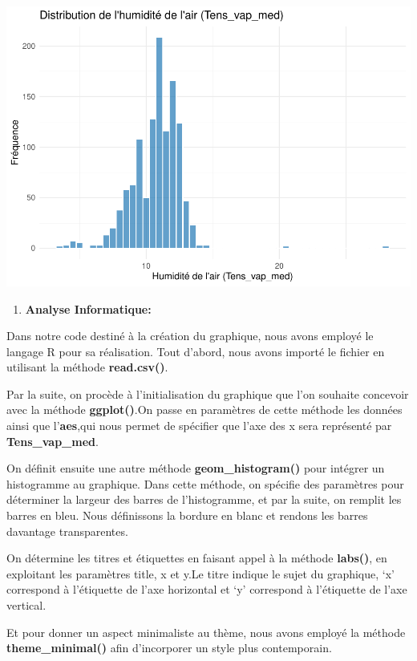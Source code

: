 \documentclass[
]{article}
\providecommand{\tightlist}{%
  \setlength{\itemsep}{0pt}\setlength{\parskip}{0pt}}
\begin{document}
\includegraphics{Rapport_files/figure-latex/unnamed-chunk-1-1.pdf}

\begin{enumerate}
\def\labelenumi{\arabic{enumi}.}
\tightlist
\item
  \textbf{Analyse Informatique:}
\end{enumerate}

Dans notre code destiné à la création du graphique, nous avons employé
le langage R pour sa réalisation. Tout d'abord, nous avons importé le
fichier en utilisant la méthode \textbf{read.csv()}.

Par la suite, on procède à l'initialisation du graphique que l'on
souhaite concevoir avec la méthode \textbf{ggplot()}.On passe en
paramètres de cette méthode les données ainsi que l'\textbf{aes},qui
nous permet de spécifier que l'axe des x sera représenté par
\textbf{Tens\_vap\_med}.

On définit ensuite une autre méthode \textbf{geom\_histogram()} pour
intégrer un histogramme au graphique. Dans cette méthode, on spécifie
des paramètres pour déterminer la largeur des barres de l'histogramme,
et par la suite, on remplit les barres en bleu. Nous définissons la
bordure en blanc et rendons les barres davantage transparentes.

On détermine les titres et étiquettes en faisant appel à la méthode
\textbf{labs()}, en exploitant les paramètres title, x et y.Le titre
indique le sujet du graphique, `x' correspond à l'étiquette de l'axe
horizontal et `y' correspond à l'étiquette de l'axe vertical.

Et pour donner un aspect minimaliste au thème, nous avons employé la
méthode \textbf{theme\_minimal()} afin d'incorporer un style plus
contemporain.
\end{document}
